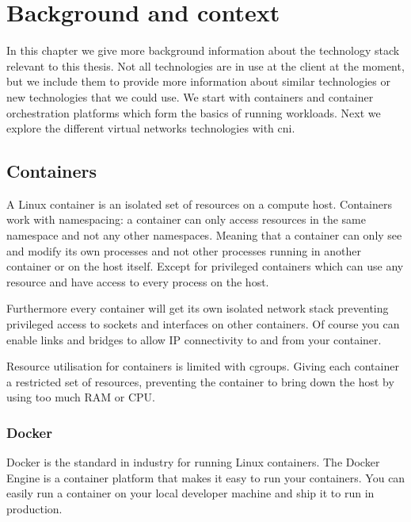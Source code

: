\chapter{Background and context}

In this chapter we give more background information about the technology stack relevant to this thesis. Not all technologies are in use at the client at the moment, but we include them to provide more information about similar technologies or new technologies that we could use. We start with containers and container orchestration platforms which form the basics of running workloads. Next we explore the different virtual networks technologies with \gls{cni}.

\section{Containers}
A Linux container is an isolated set of resources on a compute host. Containers work with namespacing: a container can only access resources in the same namespace and not any other namespaces. Meaning that a container can only see and modify its own processes and not other processes running in another container or on the host itself. Except for privileged containers which can use any resource and have access to every process on the host. 

Furthermore every container will get its own isolated network stack preventing privileged access to sockets and interfaces on other containers. Of course you can enable links and bridges to allow IP connectivity to and from your container.

Resource utilisation for containers is limited with \glspl{cgroup}. Giving each container a restricted set of resources, preventing the container to bring down the host by using too much RAM or CPU\cite{docker_security}.

\subsection{Docker}
Docker is the standard in industry for running Linux containers. The Docker Engine is a container platform that makes it easy to run your containers. You can easily run a container on your local developer machine and ship it to run in production. 

